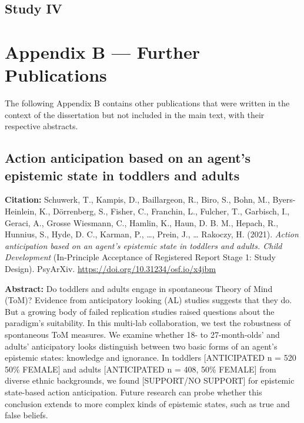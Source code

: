 \documentclass[
]{scrbook}
\begin{document}
\begin{minipage}{\textwidth}

\end{minipage}



\newpage

\section{Study IV}\label{studyIV}

\begin{minipage}{\textwidth}

\end{minipage}



\chapter{Appendix B --- Further Publications}\label{appendixB}

The following Appendix B contains other publications that were written in the context of the dissertation but not included in the main text, with their respective abstracts.

\section{Action anticipation based on an agent's epistemic state in toddlers and adults}\label{action-anticipation-based-on-an-agents-epistemic-state-in-toddlers-and-adults}

\textbf{Citation:} Schuwerk, T., Kampis, D., Baillargeon, R., Biro, S., Bohn, M., Byers-Heinlein, K., Dörrenberg, S., Fisher, C., Franchin, L., Fulcher, T., Garbisch, I., Geraci, A., Grosse Wiesmann, C., Hamlin, K., Haun, D. B. M., Hepach, R., Hunnius, S., Hyde, D. C., Karman, P., \ldots, Prein, J., \ldots{} Rakoczy, H. (2021). \emph{Action anticipation based on an agent's epistemic state in toddlers and adults. Child Development} (In-Principle Acceptance of Registered Report Stage 1: Study Design). PsyArXiv. \url{https://doi.org/10.31234/osf.io/x4jbm}

\textbf{Abstract:} Do toddlers and adults engage in spontaneous Theory of Mind (ToM)? Evidence from anticipatory looking (AL) studies suggests that they do. But a growing body of failed replication studies raised questions about the paradigm's suitability. In this multi-lab collaboration, we test the robustness of spontaneous ToM measures. We examine whether 18- to 27-month-olds' and adults' anticipatory looks distinguish between two basic forms of an agent's epistemic states: knowledge and ignorance. In toddlers {[}ANTICIPATED n = 520 50\% FEMALE{]} and adults {[}ANTICIPATED n = 408, 50\% FEMALE{]} from diverse ethnic backgrounds, we found {[}SUPPORT/NO SUPPORT{]} for epistemic state-based action anticipation. Future research can probe whether this conclusion extends to more complex kinds of epistemic states, such as true and false beliefs.
\end{document}
